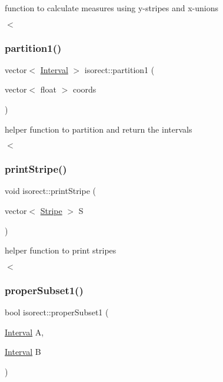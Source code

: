 function to calculate measures using y-\/stripes and x-\/unions 

$<$ \mbox{\label{classisorect_ab488becc2518f42929ddec2468c60e9e}} 
\subsubsection{\texorpdfstring{partition1()}{partition1()}}
{\footnotesize\ttfamily vector$<$ \hyperlink{classInterval}{Interval} $>$ isorect\+::partition1 (\begin{DoxyParamCaption}\item[{vector$<$ float $>$}]{coords }\end{DoxyParamCaption})}



helper function to partition and return the intervals 

$<$ \mbox{\label{classisorect_abc81549a79ee630c09982f1b560eb644}} 
\subsubsection{\texorpdfstring{print\+Stripe()}{printStripe()}}
{\footnotesize\ttfamily void isorect\+::print\+Stripe (\begin{DoxyParamCaption}\item[{vector$<$ \hyperlink{classStripe}{Stripe} $>$}]{S }\end{DoxyParamCaption})}



helper function to print stripes 

$<$ \mbox{\label{classisorect_a6382fc3ab9d83e36fcb572b1a615fd5f}} 
\subsubsection{\texorpdfstring{proper\+Subset1()}{properSubset1()}}
{\footnotesize\ttfamily bool isorect\+::proper\+Subset1 (\begin{DoxyParamCaption}\item[{\hyperlink{classInterval}{Interval}}]{A,  }\item[{\hyperlink{classInterval}{Interval}}]{B }\end{DoxyParamCaption})}



